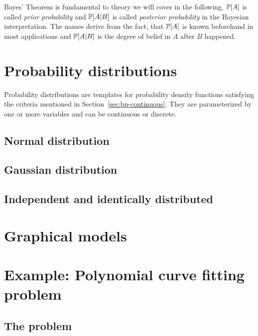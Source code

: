 Bayes' Theorem is fundamental to theory we will cover in the following.
$\mathbb P[A]$ is called \emph{prior probability} and $\mathbb P[A|B]$ is called \emph{posterior probability} in the Bayesian interpretation.
The names derive from the fact, that $\mathbb P[A]$ is known beforehand in most applications and $\mathbb P[A|B]$ is the degree of belief in $A$ after $B$ happened.

\section{Probability distributions}
\label{sec:bp-dist}
%
Probability distributions are templates for probability density functions
satisfying the criteria mentioned in Section~\ref{sec:bp-continuous}.
They are parameterized by one or more variables and can be continuous or discrete.

\subsection{Normal distribution}
\label{sec:bp-norm-dist}
%

\subsection{Gaussian distribution}
\label{sec:bp-gaussian-dist}
%

\subsection{Independent and identically distributed}
\label{sec:bp-iid}
%

\section{Graphical models}
\label{sec:bp-graphical-models}
%

\section{Example: Polynomial curve fitting problem}
\label{sec:bp-curve-fitting}
%
\subsection{The problem}
%

